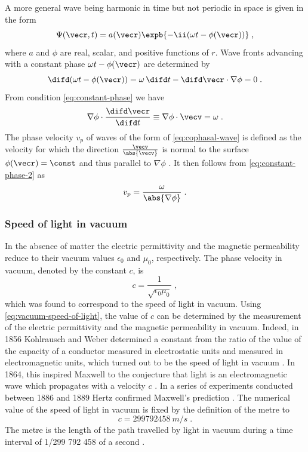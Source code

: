 \documentclass[
twoside,
openright,
titlepage,
numbers=noenddot,
headinclude,
fleqn,
a4paper,
footinclude=true,
cleardoublepage=empty,
abstractoff,
BCOR=5mm,
paper=a4,
fontsize=11pt,
british,ngerman,american,
]{scrreprt}
\begin{document}
A more general wave being harmonic in time but not periodic in space
is given in the form
\begin{equation}
  \label{eq:cophasal-wave}
  \Psi(\vecr,t) = a(\vecr)\expb{-\ii(\omega t -\phi(\vecr))} \;,
\end{equation}
where $a$ and $\phi$ are real, scalar, and positive functions of $r$.
Wave fronts advancing with a constant phase $\omega t - \phi(\vecr)$
are determined by
\begin{equation}
  \label{eq:constant-phase}
  \difd(\omega t -\phi(\vecr)) 
  = \omega\,\difd t - \difd\vecr\cdot\nabla\phi 
  = 0 \;.
\end{equation}
From  condition \cref{eq:constant-phase} we have 
\begin{equation}
  \label{eq:constant-phase-2}
  \nabla\phi\cdot\frac{\difd\vecr}{\difd t} 
  \equiv \nabla\phi\cdot\vecv 
  = \omega \;.
\end{equation}
The phase velocity $v_p$ of waves of the form of
\cref{eq:cophasal-wave} is defined as the velocity for which the
direction $\frac{\vecv}{\abs{\vecv}}$ is normal to the surface
$\phi(\vecr)=\const$ and thus parallel to $\nabla\phi$
\cite{BornWolf}.  It then follows from \cref{eq:constant-phase-2} as
\begin{equation}
  \label{eq:cophasal-velocity}
    v_p = \frac{\omega}{\abs{\nabla\phi}} \;.
\end{equation}


\subsubsection{Speed of light in vacuum}
\label{sec:speed-of-light}

In the absence of matter the electric permittivity and the magnetic
permeability reduce to their vacuum values $\epsilon_0$ and $\mu_0$,
respectively.  The phase velocity in vacuum, denoted by the constant
$c$, is
\begin{equation}
  \label{eq:vacuum-speed-of-light}
  c=\frac{1}{\sqrt{\epsilon_0\mu_0}}\;,
\end{equation}
which was found to correspond to the speed of light in vacuum. Using
\cref{eq:vacuum-speed-of-light}, the value of $c$ can be determined by
the measurement of the electric permittivity and the magnetic
permeability in vacuum.  Indeed, in 1856 Kohlrausch and Weber
determined a constant from the ratio of the value of the capacity of a
conductor measured in electrostatic units and measured in
electromagnetic units, which turned out to be the speed of light in
vacuum \cite{Kohlrausch1857, Stille1957}.  In 1864, this inspired
Maxwell to the conjecture that light is an electromagnetic wave which
propagates with a velocity $c$ \cite{Maxwell1864}.  In a series of
experiments conducted between 1886 and 1889 Hertz confirmed Maxwell's
prediction \cite{Hertz1888}.  The numerical value of the speed of
light in vacuum is fixed by the definition of the metre to
\begin{equation}
  \label{eq:speed-of-light-vacuum-value}
   c = \SI{299792458}{m/s} \;.
\end{equation}
The metre is the length of the path travelled by light in vacuum
during a time interval of 1/299 792 458 of a second \cite{Taylor2008}.
\end{document}
